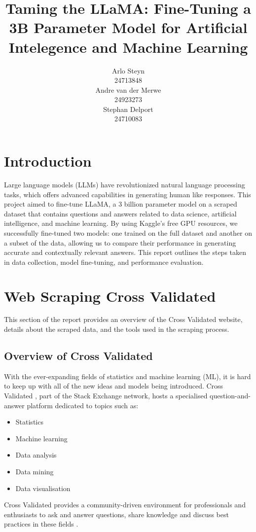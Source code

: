 \documentclass[10pt]{article}
\title{Taming the LLaMA: Fine-Tuning a 3B Parameter Model for Artificial Intelegence and Machine Learning}
\author{
        \begin{minipage}{0.3\textwidth}
            \centering
            Arlo Steyn\\
            24713848
        \end{minipage}%
    \hfill
        \begin{minipage}{0.3\textwidth}
            \centering
            Andre van der Merwe\\
            24923273
        \end{minipage}%
    \hfill
        \begin{minipage}{0.3\textwidth}
            \centering
            Stephan Delport\\
            24710083
        \end{minipage}%
}
\begin{document}
\maketitle

\section{Introduction}
Large language models (LLMs) have revolutionized natural language processing tasks,
which offers advanced capabilities in generating human like responses. This project
aimed to fine-tune LLaMA, a 3 billion parameter model on a scraped dataset that contains
questions and answers related to data science, artificial intelligence, and machine learning.
By using Kaggle's free GPU resources, we successfully fine-tuned two models: one trained on
the full dataset and another on a subset of the data, allowing us to compare their performance
in generating accurate and contextually relevant answers. This report outlines the steps taken
in data collection, model fine-tuning, and performance evaluation.

\section{Web Scraping Cross Validated}

This section of the report provides an overview of the Cross Validated website,
details about the scraped data, and the tools used in the scraping process.

\subsection{Overview of Cross Validated}

With the ever-expanding fields of statistics and machine learning (ML), it is hard to keep up with all of
the new ideas and models being introduced.
Cross Validated \cite{stackexchange}, part of the Stack Exchange network, hosts a specialised question-and-answer platform
dedicated to topics such as:
\begin{itemize}
    \item Statistics
    \item Machine learning
    \item Data analysis
    \item Data mining
    \item Data visualisation
\end{itemize}
Cross Validated provides a community-driven environment for professionals and enthusiasts to ask and answer
questions, share knowledge and discuss best practices in these fields \cite{stackexchange-tour}.
\end{document}
